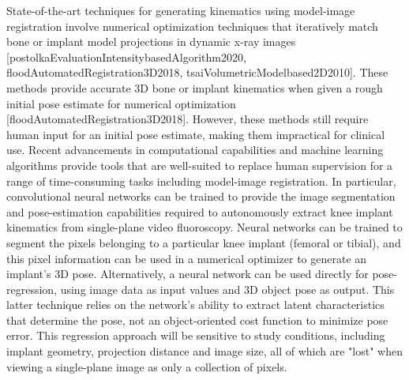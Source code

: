 State-of-the-art techniques for generating kinematics using model-image registration involve numerical optimization techniques that iteratively match bone or implant model projections in dynamic x-ray images [postolkaEvaluationIntensitybasedAlgorithm2020, floodAutomatedRegistration3D2018, tsaiVolumetricModelbased2D2010]. These methods provide accurate 3D bone or implant kinematics when given a rough initial pose estimate for numerical optimization [floodAutomatedRegistration3D2018]. However, these methods still require human input for an initial pose estimate, making them impractical for clinical use. 
Recent advancements in computational capabilities and machine learning algorithms provide tools that are well-suited to replace human supervision for a range of time-consuming tasks including model-image registration. In particular, convolutional neural networks can be trained to provide the image segmentation and pose-estimation capabilities required to autonomously extract knee implant kinematics from single-plane video fluoroscopy. Neural networks can be trained to segment the pixels belonging to a particular knee implant (femoral or tibial), and this pixel information can be used in a numerical optimizer to generate an implant's 3D pose. Alternatively, a neural network can be used directly for pose-regression, using image data as input values and 3D object pose as output. This latter technique relies on the network's ability to extract latent characteristics that determine the pose, not an object-oriented cost function to minimize pose error. This regression approach will be sensitive to study conditions, including implant geometry, projection distance and image size, all of which are "lost" when viewing a single-plane image as only a collection of pixels.

